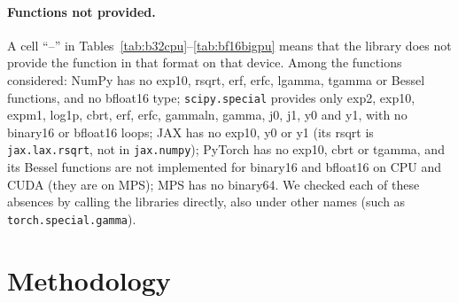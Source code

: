 \documentclass[11pt,a4paper]{article}
\begin{document}
\paragraph{Functions not provided.} A cell ``--'' in Tables~\ref{tab:b32cpu}--\ref{tab:bf16bigpu} means that the library does not provide the function in that format on that device. Among the functions considered: NumPy has no exp10, rsqrt, erf, erfc, lgamma, tgamma or Bessel functions, and no bfloat16 type; \texttt{scipy.special} provides only exp2, exp10, expm1, log1p, cbrt, erf, erfc, gammaln, gamma, j0, j1, y0 and y1, with no binary16 or bfloat16 loops; JAX has no exp10, y0 or y1 (its rsqrt is \texttt{jax.lax.rsqrt}, not in \texttt{jax.numpy}); PyTorch has no exp10, cbrt or tgamma, and its Bessel functions are not implemented for binary16 and bfloat16 on CPU and CUDA (they are on MPS); MPS has no binary64. We checked each of these absences by calling the libraries directly, also under other names (such as \texttt{torch.special.gamma}).

\section{Methodology}\label{sec:method}
\end{document}
